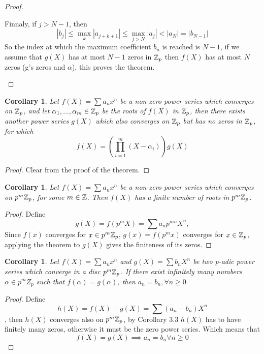 \documentclass[a4paper]{article}
\theoremstyle{plain}
\newtheorem{Cor}[thm]{Corollary}
\theoremstyle{definition}
\begin{document}
\begin{proof}
\begin{itemize}
          Finnaly, if $j > N-1$, then
          $$|b_{j}| \leq \max_{k}|a_{j+k+1}| \leq \max_{j > N}|a_{j}| < |a_{N}| = |b_{N-1}|$$
      So the index at which the maximum coefficient $b_{n}$ is reached is $N-1$, if we assume that $g(X)$ has at most $N-1$ zeros in $\Bbb Z_{p}$ then $f(X)$ has at most $N$ zeros (g's zeros and $\alpha$), this proves the theorem.
  \end{itemize}
\end{proof}
\begin{Cor}
  Let $f(X) = \sum a_{n}x^{n}$ be a non-zero power series which converges on $\Bbb Z_{p}$, and let $\alpha_{1}, ..., \alpha_{m} \in \Bbb Z_{p}$ be the roots of $f(X)$ in $\Bbb Z_{p}$, then there exists another power series $g(X)$ which also converges on $\Bbb Z_{p}$ but has no zeros in $\Bbb Z_{p}$, for which
  $$f(X) = \left(\prod_{i=1}^{m}(X-\alpha_{i})\right)g(X)$$
\end{Cor}
\begin{proof}
  Clear from the proof of the theorem.
\end{proof}
\begin{Cor}
  Let $f(X) = \sum a_{n}x^{n}$ be a non-zero power series which converges on $p^{m}\Bbb Z_{p}$, for some $m \in \Bbb Z$. Then $f(X)$ has a finite number of roots in $p^{m} \Bbb Z_{p}$.
\end{Cor}
\begin{proof}
  Define $$g(X) = f(p^{m}X) = \sum a_{n}p^{mn}X^{n},$$
  Since $f(x)$ converges for $x \in p^{m}\Bbb Z_{p}$, $g(x) = f(p^{m}x)$ converges for $x \in \Bbb Z_{p}$, applying the theorem to $g(X)$ gives the finiteness of its zeros.
\end{proof}
\begin{Cor}
  Let $f(X) = \sum a_{n}x^{n}$ and $g(X) = \sum b_{n}X^{n}$ be two p-adic power series which converge in a disc $p^{m}\Bbb Z_{p}$. If there exist infinitely many numbers $\alpha \in p^{m}Z_{p}$ such that $f(\alpha) = g(\alpha)$, then $a_{n} = b_{n}, \forall n \geq 0$
\end{Cor}
\begin{proof}
  Define $$h(X) = f(X) - g(X) = \sum(a_{n}-b_{n})X^{n}$$, then $h(X)$ converges also on $p^{m}\Bbb Z_{p}$, by Corollary 3.3 $h(X)$ has to have finitely many zeros, otherwise it must be the zero power series. Which means that
  $$f(X) = g(X) \implies a_{n} = b_{n} \forall n \geq 0$$
\end{proof}
\end{document}
